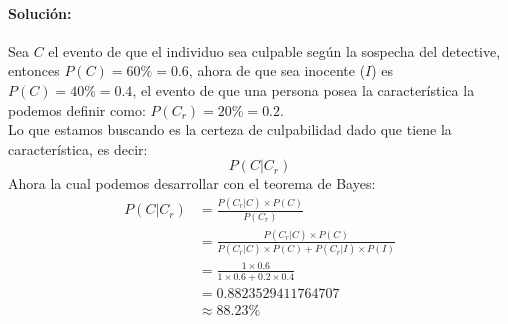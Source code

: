 \documentclass[12pt]{article}
\begin{document}
\paragraph{Solución:} Sea $C$ el evento de que el individuo sea culpable según la sospecha del detective, entonces $P(C) = 60\% = 0.6$, ahora de que sea inocente ($I$) es $P(C) = 40\% = 0.4$, el evento de que una persona posea la característica la podemos definir como:
$P(C_r) = 20\% = 0.2$.\\
Lo que estamos buscando es la certeza de culpabilidad dado que tiene la característica, es decir:
\begin{equation}
	P(C|C_r)
\end{equation}
Ahora la cual podemos desarrollar con el teorema de Bayes:
\begin{equation}
\begin{split}
P(C|C_r)&=\frac{P(C_r|C)\times P(C)}{P(C_r)}\\
&=\frac{P(C_r|C)\times P(C)}{P(C_r|C)\times P(C) + P(C_r|I)\times P(I)}\\
&=\frac{1\times 0.6}{1\times 0.6 +  0.2 \times 0.4}\\
&= 0.8823529411764707\\
&\approx 88.23\%\\
\end{split}
\end{equation}
\end{document}
